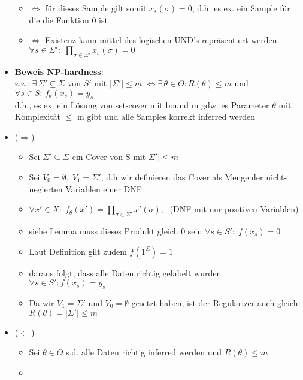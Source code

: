 \documentclass[12pt,a4paper]{article}
\begin{document}
\begin{itemize}
\begin{itemize}
\item $\Leftrightarrow$ für dieses Sample gilt somit $x_s(\sigma) = 0$, d.h. es ex. ein Sample für die die Funktion 0 ist
\item $\Leftrightarrow$ Existenz kann mittel des logischen UND's repräsentiert werden\\
$\displaystyle \forall s\in\Sigma':\; \prod_{\sigma\in\Sigma'}x_s(\sigma)=0$
\end{itemize}
\item \textbf{Beweis NP-hardness}:\\
z.z.: $\exists\, \Sigma' \subseteq \Sigma$ von $S'$ mit $|\Sigma'|\leq m$ $\Leftrightarrow \exists\, \theta\in\Theta: R(\theta) \leq m$ und\\
$\forall s \in S: \, f_\theta(x_s)=y_s$\\
d.h., es ex. ein Lösung von set-cover mit bound m gdw. es Parameter $\theta$ mit Komplexität $\leq$ m gibt und alle Samples korrekt inferred werden

\item ($\Rightarrow$)
\begin{itemize}
\item Sei $\Sigma' \subseteq \Sigma$ ein Cover von S mit $\Sigma'|\leq m$
\item Sei $V_0 = \emptyset, \; V_1=\Sigma'$, d.h wir definieren das Cover als Menge der nicht-negierten Variablen einer DNF
\item $\displaystyle \forall x' \in X:\; f_\theta(x')=\prod_{\sigma\in\Sigma'} x'(\sigma),\;$ (DNF mit nur positiven Variablen)
\item siehe Lemma muss dieses Produkt gleich 0 sein $\forall s \in S':\;f(x_s)=0$
\item Laut Definition gilt zudem $f(1^\Sigma)=1$
\item daraus folgt, dass alle Daten richtig gelabelt wurden\\ $\forall s\in S': f(x_s)=y_s$
\item Da wir $V_1 = \Sigma'$ und $V_0 = \emptyset$ gesetzt haben, ist der Regularizer auch gleich $R(\theta)= |\Sigma'| \leq m$
\end{itemize}
\item ($\Leftarrow$)
\begin{itemize}
\item Sei $\theta \in \Theta$ s.d. alle Daten richtig inferred werden und $R(\theta) \leq m$
\item 
\end{itemize}
\end{itemize}
\end{document}
